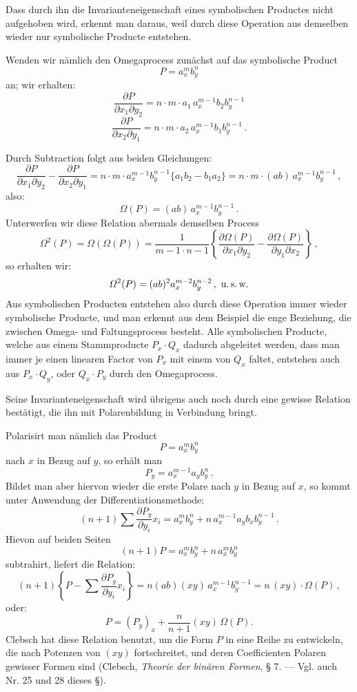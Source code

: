 \documentclass[11pt]{article}
\providecommand{\weberpage}[1]{}
\providecommand{\weq}[2]{\begin{equation}\tag{#1}#2\end{equation}}
\let\Omega\varOmega
\begin{document}
Dass durch ihn die Invarianteneigenschaft eines symbolischen Productes nicht aufgehoben wird, erkennt man daraus, weil durch diese Operation aus demselben wieder nur symbolische Producte entstehen.

Wenden wir nämlich den Omegaprocess zunächst auf das symbolische Product
\[
P = a_x^m b_y^n
\]
an; wir erhalten:
\[
\frac{\partial P}{\partial x_1\partial y_2} = n\cdot m\cdot a_1\,a_x^{m-1}b_2b_y^{n-1}
\]
\[
\frac{\partial P}{\partial x_2\partial y_1} = n\cdot m\cdot a_2\,a_x^{m-1}b_1b_y^{n-1}\,.
\]


\weberpage{23}
Durch Subtraction folgt aus beiden Gleichungen:
\[
\frac{\partial P}{\partial x_1\partial y_2} - \frac{\partial P}{\partial x_2\partial y_1} = n\cdot m\cdot a_x^{m-1}b_y^{n-1}\{a_1b_2 - b_1a_2\} = n\cdot m\cdot(ab)\,a_x^{m-1}b_y^{n-1}\,,
\]
also:
\weq{I}{\Omega(P) = (ab)\,a_x^{m-1}b_y^{n-1}\,.}
Unterwerfen wir diese Relation abermals demselben Process
\[
\Omega^2(P) = \Omega(\Omega(P)) = \frac{1}{m-1\cdot n-1}\left\{\frac{\partial\Omega(P)}{\partial x_1\partial y_2} - \frac{\partial\Omega(P)}{\partial y_1\partial x_2}\right\}\,,
\]
so erhalten wir:
\[
\Omega^2(P) = (ab)^2 a_x^{m-2}b_y^{n-2}\,, \text{ u.\,s.\,w.}
\]
Aus symbolischen Producten entstehen also durch diese Operation immer wieder symbolische Producte, und man erkennt aus dem Beispiel die enge Beziehung, die zwischen Omega- und Faltungsprocess besteht. Alle symbolischen Producte, welche aus einem Stammproducte $P_x\cdot Q_x$ dadurch abgeleitet werden, dass man immer je einen linearen Factor von $P_x$ mit einem von $Q_x$ faltet, entstehen auch aus $P_x\cdot Q_y$, oder $Q_x\cdot P_y$ durch den Omegaprocess.

Seine Invarianteneigenschaft wird übrigens auch noch durch eine gewisse Relation bestätigt, die ihn mit Polarenbildung in Verbindung bringt.

Polarisirt man nämlich das Product
\[
P = a_x^m b_y^n
\]
nach $x$ in Bezug auf $y$, so erhält man
\[
P_y = a_x^{m-1}a_y b_y^n\,.
\]
Bildet man aber hiervon wieder die erste Polare nach $y$ in Bezug auf $x$, so kommt unter Anwendung der Differentiationsmethode:
\[
(n+1)\sum\frac{\partial P_y}{\partial y_i}x_i = a_x^m b_y^n + n\,a_x^{m-1}a_y b_x b_y^{n-1}\,.
\]
Hievon auf beiden Seiten
\[
(n+1)P = a_x^m b_y^n + n\,a_x^m b_y^n
\]
subtrahirt, liefert die Relation:
\[
(n+1)\left\{P - \sum\frac{\partial P_y}{\partial y_i}x_i\right\} = n(ab)(xy)\,a_x^{m-1}b_y^{n-1} = n\,(xy)\cdot\Omega(P)\,,
\]
oder:
\weq{II}{P = (P_y)_x + \frac{n}{n+1}(xy)\,\Omega(P).}
Clebsch hat diese Relation benutzt, um die Form $P$ in eine Reihe zu entwickeln, die nach Potenzen von $(xy)$ fortschreitet, und deren Coefficienten Polaren gewisser Formen sind (Clebsch, \textit{Theorie der binären Formen}, § 7. — Vgl. auch Nr. 25 und 28 dieses §).
\end{document}

